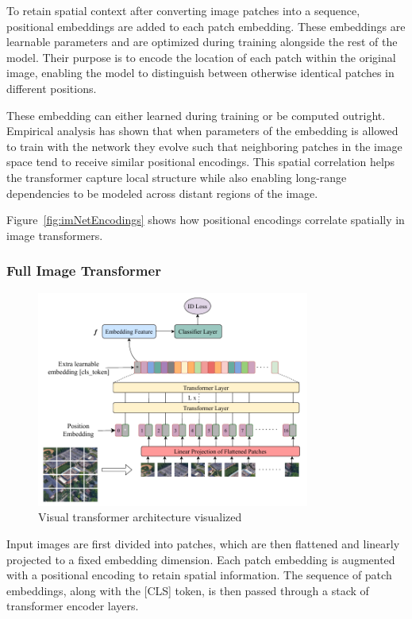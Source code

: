 \documentclass{pracalicmgr}
\begin{document}
To retain spatial context after converting image patches into a sequence, positional embeddings are added to each patch embedding. These embeddings are learnable parameters and are optimized during training alongside the rest of the model. Their purpose is to encode the location of each patch within the original image, enabling the model to distinguish between otherwise identical patches in different positions.

These embedding can either learned during training or be computed outright. Empirical analysis has shown that when parameters of the embedding is allowed to train with the network they evolve such that neighboring patches in the image space tend to receive similar positional encodings. This spatial correlation helps the transformer capture local structure while also enabling long-range dependencies to be modeled across distant regions of the image.

Figure~\ref{fig:imNetEncodings} shows how positional encodings correlate spatially in image transformers.

\subsubsection{Full Image Transformer}

\begin{figure}[H]
    \centering
    \includegraphics[width=0.8\textwidth]{src/visNet.pdf}
    \caption{Visual transformer architecture visualized\cite{ViTFUllGraph}}
    \label{fig:visNetArch}
\end{figure}

Input images are first divided into patches, which are then flattened and linearly projected to a fixed embedding dimension. Each patch embedding is augmented with a positional encoding to retain spatial information. The sequence of patch embeddings, along with the [CLS] token, is then passed through a stack of transformer encoder layers.
\end{document}
